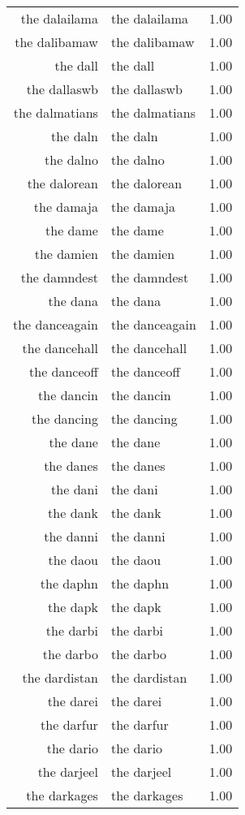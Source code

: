\begin{table}[ht]
\begin{tabular}{rlr}
  the dalailama & the dalailama & 1.00 \\ 
  the dalibamaw & the dalibamaw & 1.00 \\ 
  the dall & the dall & 1.00 \\ 
  the dallaswb & the dallaswb & 1.00 \\ 
  the dalmatians & the dalmatians & 1.00 \\ 
  the daln & the daln & 1.00 \\ 
  the dalno & the dalno & 1.00 \\ 
  the dalorean & the dalorean & 1.00 \\ 
  the damaja & the damaja & 1.00 \\ 
  the dame & the dame & 1.00 \\ 
  the damien & the damien & 1.00 \\ 
  the damndest & the damndest & 1.00 \\ 
  the dana & the dana & 1.00 \\ 
  the danceagain & the danceagain & 1.00 \\ 
  the dancehall & the dancehall & 1.00 \\ 
  the danceoff & the danceoff & 1.00 \\ 
  the dancin & the dancin & 1.00 \\ 
  the dancing & the dancing & 1.00 \\ 
  the dane & the dane & 1.00 \\ 
  the danes & the danes & 1.00 \\ 
  the dani & the dani & 1.00 \\ 
  the dank & the dank & 1.00 \\ 
  the danni & the danni & 1.00 \\ 
  the daou & the daou & 1.00 \\ 
  the daphn & the daphn & 1.00 \\ 
  the dapk & the dapk & 1.00 \\ 
  the darbi & the darbi & 1.00 \\ 
  the darbo & the darbo & 1.00 \\ 
  the dardistan & the dardistan & 1.00 \\ 
  the darei & the darei & 1.00 \\ 
  the darfur & the darfur & 1.00 \\ 
  the dario & the dario & 1.00 \\ 
  the darjeel & the darjeel & 1.00 \\ 
  the darkages & the darkages & 1.00 \\ 

\end{tabular}
\end{table}

